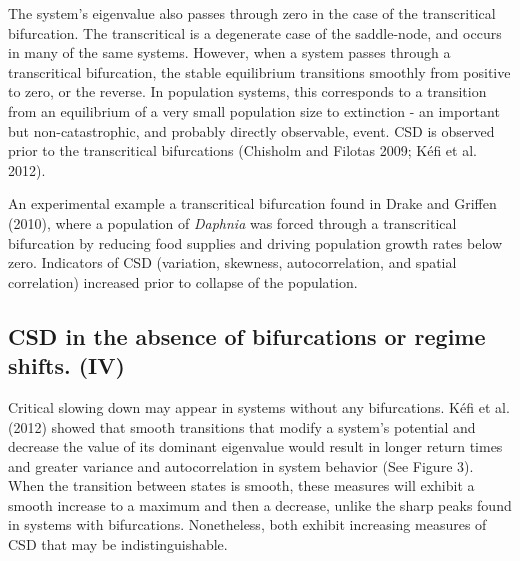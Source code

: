 \documentclass[author-year, review]{elsarticle} %
\begin{document}
The system's eigenvalue also passes through zero in the case of the
transcritical bifurcation. The transcritical is a degenerate case of the
saddle-node, and occurs in many of the same systems. However, when a
system passes through a transcritical bifurcation, the stable
equilibrium transitions smoothly from positive to zero, or the reverse.
In population systems, this corresponds to a transition from an
equilibrium of a very small population size to extinction - an important
but non-catastrophic, and probably directly observable, event. CSD is
observed prior to the transcritical bifurcations (Chisholm and Filotas
2009; Kéfi et al. 2012).

An experimental example a transcritical bifurcation found in Drake and
Griffen (2010), where a population of \emph{Daphnia} was forced through
a transcritical bifurcation by reducing food supplies and driving
population growth rates below zero. Indicators of CSD (variation,
skewness, autocorrelation, and spatial correlation) increased prior to
collapse of the population.

\subsection{CSD in the absence of bifurcations or regime shifts. (IV)}

Critical slowing down may appear in systems without any bifurcations.
Kéfi et al. (2012) showed that smooth transitions that modify a system's
potential and decrease the value of its dominant eigenvalue would result
in longer return times and greater variance and autocorrelation in
system behavior (See Figure 3). When the transition between states is
smooth, these measures will exhibit a smooth increase to a maximum and
then a decrease, unlike the sharp peaks found in systems with
bifurcations. Nonetheless, both exhibit increasing measures of CSD that
may be indistinguishable.
\end{document}
